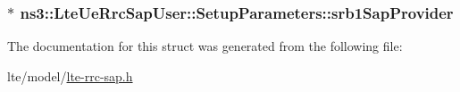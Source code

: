 \subsubsection[{\texorpdfstring{srb1\+Sap\+Provider}{srb1SapProvider}}]{$\ast$ ns3\+::\+Lte\+Ue\+Rrc\+Sap\+User\+::\+Setup\+Parameters\+::srb1\+Sap\+Provider}\hypertarget{structns3_1_1LteUeRrcSapUser_1_1SetupParameters_ac80dc697937158476f8787ca249cbb8e}{}\label{structns3_1_1LteUeRrcSapUser_1_1SetupParameters_ac80dc697937158476f8787ca249cbb8e}


The documentation for this struct was generated from the following file\+:\begin{DoxyCompactItemize}
\item 
lte/model/\hyperlink{lte-rrc-sap_8h}{lte-\/rrc-\/sap.\+h}\end{DoxyCompactItemize}

